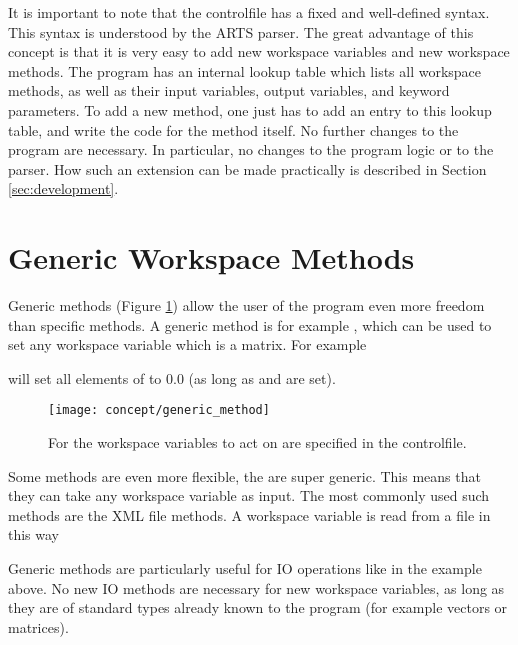 It is important to note that the controlfile has a fixed and
well-defined syntax. This syntax is understood by the ARTS parser.
The great advantage of this concept is that it is very easy to add
new workspace variables and new workspace methods. The program has
an internal lookup table which lists all workspace methods, as well
as their input variables, output variables, and keyword
parameters. To add a new method, one just has to add an entry to
this lookup table, and write the code for the method itself. No
further changes to the program are necessary. In particular, no
changes to the program logic or to the parser. How such an extension
can be made practically is described in Section \ref{sec:development}.


\section{Generic Workspace Methods}
\label{sec:concept:generic}

Generic methods (Figure \ref{fig:generic_method}) allow the user of
the program even more freedom than specific methods. A generic method
is for example , which can be used to set any
workspace variable which is a matrix. For example
\begin{quote}
\end{quote}
will set all elements of  to 0.0 (as long as
 and  are set).

\begin{figure}
  \begin{center}
    \texttt{[image: concept/generic\_method]}
    \caption{For  the workspace variables to act on are
        specified in the controlfile.}
    \label{fig:generic_method}
  \end{center}
\end{figure}

Some methods are even more flexible, the are super generic. This means
that they can take any workspace variable as input. The most commonly
used such methods are the XML file methods. A workspace variable is
read from a file in this way
\begin{quote}
\end{quote}
Generic methods are particularly useful for IO operations like in the
example above. No new IO methods are necessary for new workspace
variables, as long as they are of standard types already known to the
program (for example vectors or matrices). 



